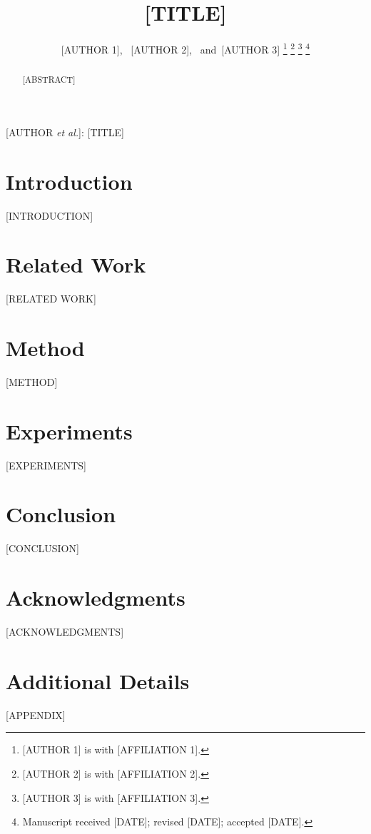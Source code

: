 \documentclass[journal]{IEEEtran}
\title{[TITLE]}
\author{[AUTHOR 1],~\IEEEmembership{Member,~IEEE,}
        [AUTHOR 2],~\IEEEmembership{Fellow,~IEEE,}
        and~[AUTHOR 3]
\thanks{[AUTHOR 1] is with [AFFILIATION 1].}
\thanks{[AUTHOR 2] is with [AFFILIATION 2].}
\thanks{[AUTHOR 3] is with [AFFILIATION 3].}
\thanks{Manuscript received [DATE]; revised [DATE]; accepted [DATE].}}
\theoremstyle{plain}
\theoremstyle{definition}
\theoremstyle{remark}
\begin{document}
%
{[AUTHOR \MakeLowercase{\textit{et al.}}]: [TITLE]}

\maketitle

\begin{abstract}
[ABSTRACT]
\end{abstract}

\begin{IEEEkeywords}
[KEYWORDS]
\end{IEEEkeywords}

\section{Introduction}
\label{sec:intro}
[INTRODUCTION]

\section{Related Work}
\label{sec:related}
[RELATED WORK]

\section{Method}
\label{sec:method}
[METHOD]

\section{Experiments}
\label{sec:experiments}
[EXPERIMENTS]

\section{Conclusion}
\label{sec:conclusion}
[CONCLUSION]

\section*{Acknowledgments}
[ACKNOWLEDGMENTS]




\appendices
\section{Additional Details}
[APPENDIX]
\end{document}
